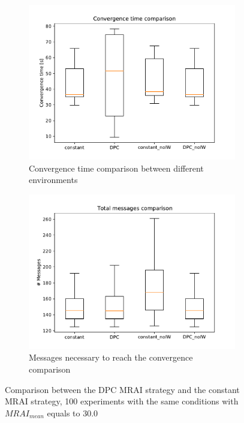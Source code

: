 \documentclass[10pt,conference,letterpaper]{IEEEtran}
\newcommand{\figwidth}{0.78}
\newcommand{\figvspace}{-1.5em}
\begin{document}
\begin{figure}[tb]
	\centering

	\begin{subfigure}{\columnwidth}
		\centering
		\includegraphics[width=\figwidth\columnwidth]{images/internet_like/dpc-vs-constant-30fixed/constant-dpc-comparison-30fixed_time_boxplot}
		\caption{Convergence time comparison between different environments}
		\label{fig:dpc_mrai_evolution_IW_std}
		\qquad
	\end{subfigure}

	\begin{subfigure}{\columnwidth}
		\centering
		\includegraphics[width=\figwidth\columnwidth]{images/internet_like/dpc-vs-constant-30fixed/constant-dpc-comparison-30fixed_messages_boxplot}
		\caption{Messages necessary to reach the convergence comparison}
		\label{fig:dpc_mrai_evolution_noIW_std}
		\qquad
	\end{subfigure}

	\caption{Comparison between the \ac{DPC} \ac{MRAI} strategy and the constant \ac{MRAI}
			 strategy, 100 experiments with the same conditions with $MRAI_{mean}$
			 equals to \num{30.0}}
	\label{fig:dpc_mrai_evolution_std}
	\vspace{\figvspace}
\end{figure}
\end{document}

